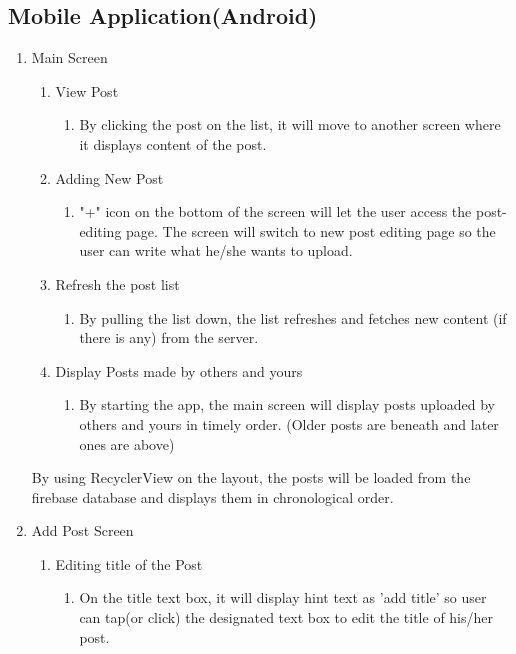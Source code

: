 \documentclass[conference]{IEEEtran}
\numberwithin{figure}{subsection}
\begin{document}
\subsection{\textbf{Mobile Application(Android)}}
\begin{enumerate}
    \item Main Screen
    \begin{enumerate}
        \item View Post
            \begin{enumerate}
                \item By clicking the post on the list, it will move to another screen where it displays content of the post.
            \end{enumerate}
        \item Adding New Post
            \begin{enumerate}
                \item "+" icon  on  the  bottom  of  the  screen  will  let  the  user access  the  post-editing  page. The screen will switch to new post editing page so the user can write what he/she wants to upload.
            \end{enumerate}
        \item Refresh the post list
            \begin{enumerate}
                \item By pulling the list down, the list refreshes and fetches new content (if there is any) from the server.
            \end{enumerate}
        \item Display Posts made by others and yours
            \begin{enumerate}
                \item By starting the app, the main screen will display posts uploaded by others and yours in timely order. (Older posts are beneath and later ones are above)
            \end{enumerate}
    \end{enumerate}
    By using RecyclerView on the layout, the posts will be loaded from the firebase database and displays them in chronological order.\\
    \item Add Post Screen
    \begin{enumerate}
        \item Editing title of the Post
            \begin{enumerate}
                \item On the title text box, it will display hint text as 'add title' so user can tap(or click) the designated text box to edit the title of his/her post.

\end{enumerate}
\end{enumerate}
\end{enumerate}
\end{document}
